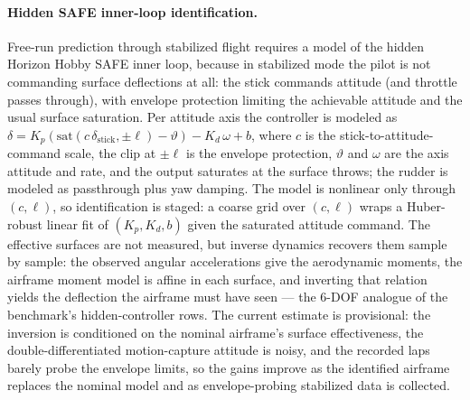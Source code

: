 \documentclass[11pt]{article}
\begin{document}
\paragraph{Hidden SAFE inner-loop identification.}
Free-run prediction through stabilized flight requires a model of the hidden
Horizon Hobby SAFE inner loop, because in stabilized mode the pilot is not
commanding surface deflections at all: the stick commands attitude (and
throttle passes through), with envelope protection limiting the achievable
attitude and the usual surface saturation. Per attitude axis the controller is
modeled as
$\delta = K_p\left(\mathrm{sat}(c\,\delta_{\mathrm{stick}},\pm\ell) -
\vartheta\right) - K_d\,\omega + b$,
where $c$ is the stick-to-attitude-command scale, the clip at $\pm\ell$ is the
envelope protection, $\vartheta$ and $\omega$ are the axis attitude and rate,
and the output saturates at the surface throws; the rudder is modeled as
passthrough plus yaw damping. The model is nonlinear only through $(c,\ell)$,
so identification is staged: a coarse grid over $(c,\ell)$ wraps a
Huber-robust linear fit of $(K_p, K_d, b)$ given the saturated attitude
command. The effective surfaces are not measured, but inverse dynamics
recovers them sample by sample: the observed angular accelerations give the
aerodynamic moments, the airframe moment model is affine in each surface, and
inverting that relation yields the deflection the airframe must have seen —
the 6-DOF analogue of the benchmark's hidden-controller rows. The current
estimate is provisional: the inversion is conditioned on the nominal
airframe's surface effectiveness, the double-differentiated motion-capture
attitude is noisy, and the recorded laps barely probe the envelope limits, so
the gains improve as the identified airframe replaces the nominal model and as
envelope-probing stabilized data is collected.
\end{document}
